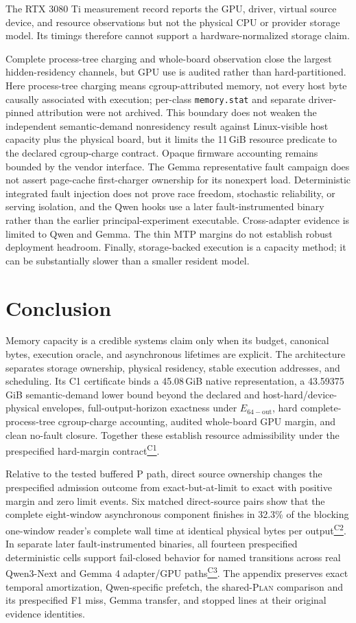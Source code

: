 \documentclass[letterpaper,twocolumn,10pt]{article}
\newcommand{\Plan}{\textsc{Plan}\xspace}
\newcommand{\GiB}{\,GiB\xspace}
\newcommand{\claimref}[1]{\hyperlink{claim:#1}{\textsuperscript{\textsf{#1}}}}
\begin{document}
The RTX 3080 Ti measurement record reports the GPU, driver, virtual source device, and
resource observations but not the physical CPU or provider storage model.  Its
timings therefore cannot support a hardware-normalized storage claim.

Complete process-tree charging and whole-board observation close the largest
hidden-residency channels, but GPU use is audited rather than hard-partitioned.
Here process-tree charging means cgroup-attributed memory, not every host byte
causally associated with execution; per-class \texttt{memory.stat} and separate
driver-pinned attribution were not archived.  This boundary does not weaken
the independent semantic-demand nonresidency result against Linux-visible host
capacity plus the physical board, but it limits the 11\GiB resource predicate
to the declared cgroup-charge contract.
Opaque firmware accounting remains bounded by the vendor interface.  The
Gemma representative fault campaign does not assert page-cache first-charger
ownership for its nonexpert load.  Deterministic integrated fault injection
does not prove race freedom, stochastic reliability, or serving isolation, and
the Qwen hooks use a later fault-instrumented binary rather than the earlier
principal-experiment
executable.  Cross-adapter evidence is limited to Qwen and Gemma.  The thin MTP
margins do not establish robust deployment headroom.  Finally, storage-backed
execution is a capacity method; it can be substantially slower than a smaller
resident model.

\section{Conclusion}

Memory capacity is a credible systems claim only when its budget, canonical
bytes, execution oracle, and asynchronous lifetimes are explicit.  The architecture
separates storage ownership, physical residency, stable execution addresses,
and scheduling.  Its C1 certificate binds a 45.08\GiB native
representation, a 43.59375\GiB semantic-demand lower bound beyond the declared
and host-hard/device-physical envelopes, full-output-horizon exactness under
$E_{\mathrm{64-out}}$, hard complete-process-tree cgroup-charge accounting, audited
whole-board GPU margin, and clean no-fault closure.  Together these establish
resource admissibility under the prespecified hard-margin contract\claimref{C1}.

Relative to the tested buffered P path, direct source ownership changes the
prespecified admission outcome from exact-but-at-limit to exact with positive
margin and zero limit events.  Six matched direct-source pairs show that the
complete eight-window asynchronous component finishes in 32.3\% of the
blocking one-window reader's complete wall time at identical physical bytes per
output\claimref{C2}.  In separate later fault-instrumented binaries, all fourteen prespecified
deterministic cells support fail-closed behavior for named transitions across
real Qwen3-Next and Gemma 4 adapter/GPU paths\claimref{C3}.  The appendix preserves exact temporal
amortization, Qwen-specific prefetch, the shared-\Plan comparison and its
prespecified F1 miss,
Gemma transfer, and stopped lines at their original evidence identities.
\end{document}
